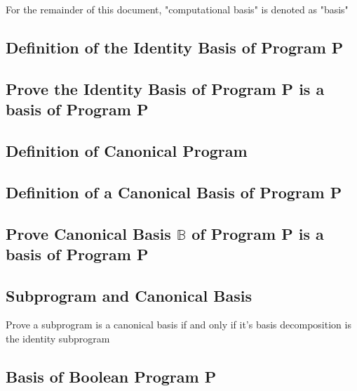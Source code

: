 \documentclass[11pt]{article}
\begin{document}
For the remainder of this document, "computational basis" is denoted as "basis"





\subsection{Definition of the Identity Basis of Program P}





\subsection{Prove the Identity Basis of Program P is a basis of Program P}
\subsection{Definition of Canonical Program}





\subsection{Definition of a Canonical Basis of Program P}





\subsection{Prove Canonical Basis $\mathbb{B}$ of Program P is a basis of Program P}






\subsection{Subprogram and Canonical Basis}
Prove a subprogram is a canonical basis if and only if it's basis decomposition is the identity subprogram






\subsection{Basis of Boolean Program P}
\end{document}
